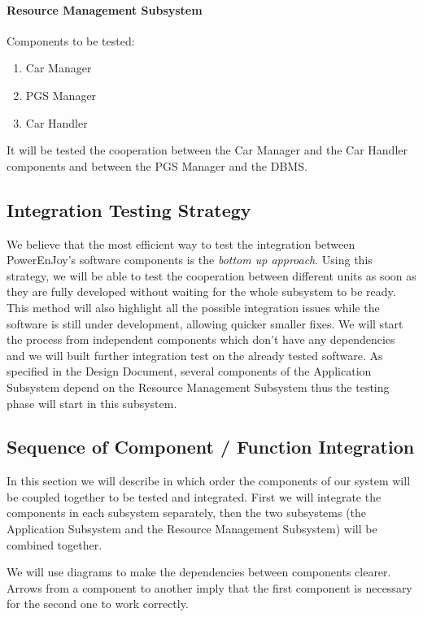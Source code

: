 \documentclass[english]{article}
\begin{document}
\paragraph{Resource Management Subsystem}
Components to be tested:
\begin{enumerate}
\item Car Manager
\item PGS Manager
\item Car Handler
\end{enumerate}

It will be tested the cooperation between the Car Manager and the Car Handler components and between the PGS Manager and the DBMS.



\subsection{Integration Testing Strategy}
We believe that the most efficient way to test the integration between PowerEnJoy's software components is the \emph{bottom up approach}. Using this strategy, we will be able to test the cooperation between different units as soon as they are fully developed without waiting for the whole subsystem to be ready. This method will also highlight all the possible integration issues while the software is still under development, allowing quicker smaller fixes.
We will start the process from independent components which don't have any dependencies and we will built further integration test on the already  tested software.
As specified in the Design Document, several components of the Application Subsystem depend on the Resource Management Subsystem thus the testing phase will start in this subsystem.


\subsection{Sequence of Component / Function Integration}
\label{subsec:sequence}
In this section we will describe in which order the components of our system will be coupled together to be tested and integrated.
First we will integrate the components in each subsystem separately, then the two subsystems (the Application Subsystem and the Resource Management Subsystem) will be combined together.

We will use diagrams to make the dependencies between components clearer. Arrows from a component to another imply that the first component is necessary for the second one to work correctly.
\end{document}

